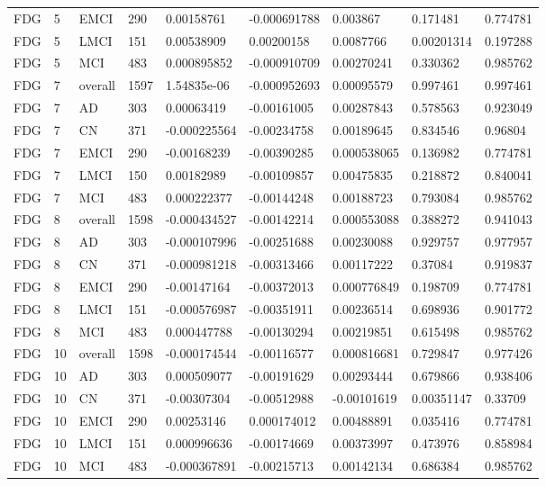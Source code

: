 \begin{landscape}
\begin{longtable}{lllllllll}
FDG & 5 & EMCI & 290 & 0.00158761 & -0.000691788 & 0.003867 & 0.171481 & 0.774781 \\
FDG & 5 & LMCI & 151 & 0.00538909 & 0.00200158 & 0.0087766 & 0.00201314 & 0.197288 \\
FDG & 5 & MCI & 483 & 0.000895852 & -0.000910709 & 0.00270241 & 0.330362 & 0.985762 \\
FDG & 7 & overall & 1597 & 1.54835e-06 & -0.000952693 & 0.00095579 & 0.997461 & 0.997461 \\
FDG & 7 & AD & 303 & 0.00063419 & -0.00161005 & 0.00287843 & 0.578563 & 0.923049 \\
FDG & 7 & CN & 371 & -0.000225564 & -0.00234758 & 0.00189645 & 0.834546 & 0.96804 \\
FDG & 7 & EMCI & 290 & -0.00168239 & -0.00390285 & 0.000538065 & 0.136982 & 0.774781 \\
FDG & 7 & LMCI & 150 & 0.00182989 & -0.00109857 & 0.00475835 & 0.218872 & 0.840041 \\
FDG & 7 & MCI & 483 & 0.000222377 & -0.00144248 & 0.00188723 & 0.793084 & 0.985762 \\
FDG & 8 & overall & 1598 & -0.000434527 & -0.00142214 & 0.000553088 & 0.388272 & 0.941043 \\
FDG & 8 & AD & 303 & -0.000107996 & -0.00251688 & 0.00230088 & 0.929757 & 0.977957 \\
FDG & 8 & CN & 371 & -0.000981218 & -0.00313466 & 0.00117222 & 0.37084 & 0.919837 \\
FDG & 8 & EMCI & 290 & -0.00147164 & -0.00372013 & 0.000776849 & 0.198709 & 0.774781 \\
FDG & 8 & LMCI & 151 & -0.000576987 & -0.00351911 & 0.00236514 & 0.698936 & 0.901772 \\
FDG & 8 & MCI & 483 & 0.000447788 & -0.00130294 & 0.00219851 & 0.615498 & 0.985762 \\
FDG & 10 & overall & 1598 & -0.000174544 & -0.00116577 & 0.000816681 & 0.729847 & 0.977426 \\
FDG & 10 & AD & 303 & 0.000509077 & -0.00191629 & 0.00293444 & 0.679866 & 0.938406 \\
FDG & 10 & CN & 371 & -0.00307304 & -0.00512988 & -0.00101619 & 0.00351147 & 0.33709 \\
FDG & 10 & EMCI & 290 & 0.00253146 & 0.000174012 & 0.00488891 & 0.035416 & 0.774781 \\
FDG & 10 & LMCI & 151 & 0.000996636 & -0.00174669 & 0.00373997 & 0.473976 & 0.858984 \\
FDG & 10 & MCI & 483 & -0.000367891 & -0.00215713 & 0.00142134 & 0.686384 & 0.985762 \\

\end{longtable}
\end{landscape}
